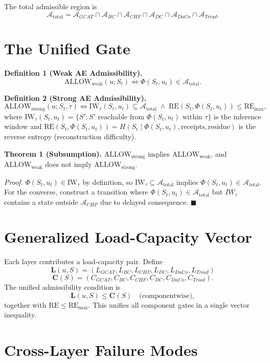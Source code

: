 \documentclass[letterpaper,10pt,conference]{ieeeconf}
\newcommand{\A}{\mathcal{A}}
\newcommand{\Atot}{\mathcal{A}_{\text{total}}}
\newcommand{\Phiop}{\Phi}
\newcommand{\IW}{\mathrm{IW}}
\newcommand{\RE}{\mathrm{RE}}
\newcommand{\St}{S_t}
\newcommand{\ut}{u_t}
\begin{document}
The total admissible region is
\[
\Atot = \A_{GCAT} \cap \A_{BC} \cap \A_{CHF} \cap \A_{DC} \cap \A_{DaCo} \cap \A_{Triad}.
\]

\section{The Unified Gate}

\textbf{Definition 1 (Weak AE Admissibility).}
\[
\text{ALLOW}_{\text{weak}}(u;\St) \iff \Phiop(\St,\ut) \in \Atot.
\]

\textbf{Definition 2 (Strong AE Admissibility).}
\[
\text{ALLOW}_{\text{strong}}(u;\St,\tau) \iff \IW_\tau(\St,\ut) \subseteq \Atot \;\wedge\; \RE(\St,\Phiop(\St,\ut)) \le \RE_{\max},
\]
where $\IW_\tau(\St,\ut) = \{S' : S' \text{ reachable from } \Phiop(\St,\ut) \text{ within } \tau\}$ is the inference window and $\RE(\St, \Phiop(\St,\ut)) = H(\St \mid \Phiop(\St,\ut), \text{receipts}, \text{residue})$ is the reverse entropy (reconstruction difficulty).

\textbf{Theorem 1 (Subsumption).} $\text{ALLOW}_{\text{strong}}$ implies $\text{ALLOW}_{\text{weak}}$, and $\text{ALLOW}_{\text{weak}}$ does not imply $\text{ALLOW}_{\text{strong}}$.

\textit{Proof.} $\Phiop(\St,\ut) \in \IW_\tau$ by definition, so $\IW_\tau \subseteq \Atot$ implies $\Phiop(\St,\ut) \in \Atot$. For the converse, construct a transition where $\Phiop(\St,\ut) \in \Atot$ but $IW_\tau$ contains a state outside $\A_{CHF}$ due to delayed consequence. \hfill $\blacksquare$

\section{Generalized Load-Capacity Vector}

Each layer contributes a load-capacity pair. Define
\[
\mathbf{L}(u,S) = (L_{GCAT}, L_{BC}, L_{CHF}, L_{DC}, L_{DaCo}, L_{Triad})
\]
\[
\mathbf{C}(S) = (C_{GCAT}, C_{BC}, C_{CHF}, C_{DC}, C_{DaCo}, C_{Triad}).
\]
The unified admissibility condition is
\[
\mathbf{L}(u,S) \le \mathbf{C}(S) \quad \text{(componentwise)},
\]
together with $\RE \le \RE_{\max}$. This unifies all component gates in a single vector inequality.

\section{Cross-Layer Failure Modes}
\end{document}
